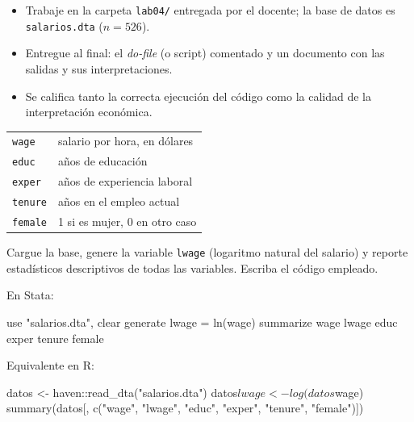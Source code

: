 \documentclass{evaluacion}
\begin{document}
\membrete

\begin{instrucciones}
\begin{itemize}
  \item Trabaje en la carpeta \texttt{lab04/} entregada por el docente;
        la base de datos es \texttt{salarios.dta} ($n = 526$).
  \item Entregue al final: el \emph{do-file} (o script) comentado y un
        documento con las salidas y sus interpretaciones.
  \item Se califica tanto la correcta ejecución del código como la
        calidad de la interpretación económica.
\end{itemize}
\end{instrucciones}

\begin{datos}
\begin{tabularx}{\linewidth}{@{}l X@{}}
  \texttt{wage}  & salario por hora, en dólares\\
  \texttt{educ}  & años de educación\\
  \texttt{exper} & años de experiencia laboral\\
  \texttt{tenure}& años en el empleo actual\\
  \texttt{female}& 1 si es mujer, 0 en otro caso\\
\end{tabularx}
\end{datos}

\begin{ejercicio}
Cargue la base, genere la variable \texttt{lwage} (logaritmo natural del
salario) y reporte estadísticos descriptivos de todas las variables.
Escriba el código empleado.

\recuadrorespuesta{4.5cm}
\begin{solucion}
En Stata:
\begin{codigo}[language=Stata]
use "salarios.dta", clear
generate lwage = ln(wage)
summarize wage lwage educ exper tenure female
\end{codigo}
Equivalente en R:
\begin{codigo}[language=R]
datos <- haven::read_dta("salarios.dta")
datos$lwage <- log(datos$wage)
summary(datos[, c("wage", "lwage", "educ", "exper", "tenure", "female")])
\end{codigo}
\end{solucion}
\end{ejercicio}
\end{document}
